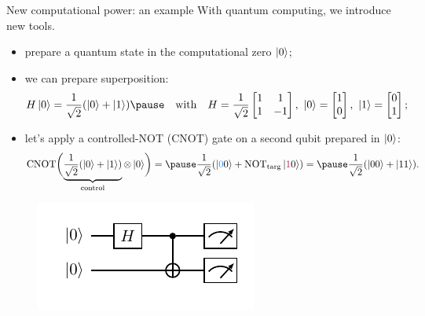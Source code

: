 \documentclass[aspectratio=169, 10pt, xcolor={svgnames}, hyperref={linkcolor=black}]{beamer}
\begin{document}
\begin{frame}{New computational power: an example}
\pause
With quantum computing, we introduce new tools.
\pause
\begin{itemize}[noitemsep]
\item[\faRocket] prepare a quantum state in the computational zero $\ket{0}$;
\pause
\item[\faSliders] we can prepare superposition:
$$H\ket{0} = \frac{1}{\sqrt{2}}(\ket{0} + \ket{1}) \pause \quad \text{with} \quad H = \frac{1}{\sqrt{2}}
\begin{bmatrix} 1 & 1 \\ 1 & -1 \end{bmatrix},\,\, \ket{0}=\begin{bmatrix} 1 \\ 0
\end{bmatrix},\,\,\ket{1}=\begin{bmatrix} 0 \\ 1 \end{bmatrix};$$
\pause
\item[\faShareAlt] let's apply a controlled-NOT (CNOT) gate on a second qubit prepared in $\ket{0}$:
$$ \text{CNOT} \biggl( \underbrace{\frac{1}{\sqrt{2}}(\ket{0} + \ket{1})}_{\text{control}}\otimes
\ket{0} \biggr) = \pause \frac{1}{\sqrt{2}}(\ket{\textcolor{bleudefrance}{0}0} +
\text{NOT}_{\rm targ}\ket{\textcolor{brightmaroon}{1}0}) = \pause \frac{1}{\sqrt{2}}(\ket{00} + \ket{11}). $$
\end{itemize}
\pause
\vspace{-0.5cm}
\begin{figure}
   \includegraphics[width=0.4\linewidth]{figures/baby3.pdf}
\end{figure}
\end{frame}
\end{document}
